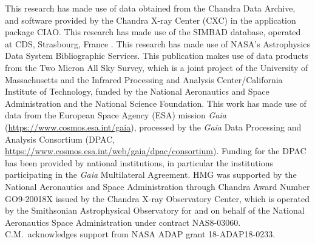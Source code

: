 \documentclass[preprint2]{aastex631}
\begin{document}
\begin{acknowledgements}

This research has made use of data obtained from the Chandra Data Archive, and software provided by the Chandra X-ray Center (CXC) in the application package CIAO.
This research has made use of the SIMBAD database,
operated at CDS, Strasbourg, France \citep{2000A&AS..143....9W}. 
This research has made use of NASA’s Astrophysics Data System Bibliographic Services.
This publication makes use of data products from the Two Micron All Sky Survey, which is a joint project of the University of Massachusetts and the Infrared Processing and Analysis Center/California Institute of Technology, funded by the National Aeronautics and Space Administration and the National Science Foundation.
This work has made use of data from the European Space Agency (ESA) mission
{\it Gaia} (\url{https://www.cosmos.esa.int/gaia}), processed by the {\it Gaia}
Data Processing and Analysis Consortium (DPAC,
\url{https://www.cosmos.esa.int/web/gaia/dpac/consortium}). Funding for the DPAC
has been provided by national institutions, in particular the institutions
participating in the {\it Gaia} Multilateral Agreement.
HMG was supported by the National Aeronautics and Space Administration through Chandra Award Number GO9-20018X issued by the Chandra X-ray Observatory Center, which is operated by the Smithsonian Astrophysical Observatory for and on behalf of the National Aeronautics Space Administration under contract NAS8-03060. C.M.\ acknowledges support from NASA ADAP grant 18-ADAP18-0233.

\end{acknowledgements}



{}



\end{document}
